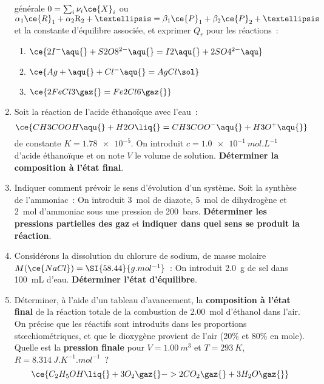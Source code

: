 \documentclass[a4paper, 12pt, final, garamond]{book}
\begin{document}
\begin{enumerate}
	      générale $0=\sum_i \nu_i{\ce{X}}_i$ ou $\alpha_1{\ce{R}}_1 + \alpha_2{\rm
			      R}_2 + … = \beta_1{\ce{P}}_1 + \beta_2{\ce{P}}_2 + …$ et la constante
	      d'équilibre associée, et exprimer $Q_r$ pour les réactions~:
	      \begin{enumerate}
		      \item $\ce{2I^-\aqu{} + S2O8^{2-}\aqu{} = I2\aqu{} +2SO4^{2-}\aqu}$
		      \item $\ce{Ag+\aqu{} + Cl^-\aqu{} = AgCl\sol}$
		      \item $\ce{2FeCl3\gaz{} = Fe2Cl6\gaz{}}$
	      \end{enumerate}
	\item Soit la réaction de l'acide éthanoïque avec l'eau~:
	      \[\ce{CH3COOH\aqu{} + H2O\liq{} = CH3COO^{-}\aqu{} + H3O^{+}\aqu{}}\]
	      de constante $K = \num{1.78e-5}$. On introduit $c =
		      \SI{1.0e-1}{mol.L^{-1}}$ d'acide éthanoïque et on note $V$ le volume de
	      solution. \textbf{Déterminer la composition à l'état final}.

	\item Indiquer comment prévoir le sens d'évolution d'un système.
	      Soit la synthèse de l'ammoniac~:
	      \smallbreak
	      \smallbreak
	      On introduit \SI{3}{mol} de diazote, \SI{5}{mol} de dihydrogène et
	      \SI{2}{mol} d'ammoniac sous une pression de \SI{200}{bars}.
	      \textbf{Déterminer les pressions partielles des gaz} et \textbf{indiquer
		      dans quel sens se produit la réaction}.
	\item Considérons la dissolution du chlorure de sodium, de masse molaire
	      $M(\ce{NaCl}) = \SI{58.44}{g.mol^{-1}}$~:
	      \smallbreak
	      \smallbreak
	      On introduit \SI{2.0}{g} de sel dans \SI{100}{mL} d'eau.
	      \textbf{Déterminer l'état d'équilibre}.

	\item Déterminer, à l'aide d'un tableau d'avancement, la \textbf{composition à
		      l'état final} de la réaction totale de la combustion de \SI{2.00}{mol}
	      d'éthanol dans l'air. On précise que les réactifs sont introduits dans
	      les proportions stœchiométriques, et que le dioxygène provient de
	      l'air (20\%  et 80\%  en mole). Quelle est la
	      \textbf{pression finale} pour $V = \SI{1.00}{m^3}$ et $T =
		      \SI{293}{K}$, $R = \SI{8.314}{J.K^{-1}.mol^{-1}}$~?
	      \[
		      \ce{C_2H_5OH\liq{} + 3O_2\gaz{} -> 2CO_2\gaz{} + 3H_2O\gaz{}}
	      \]
\end{enumerate}
\end{document}
